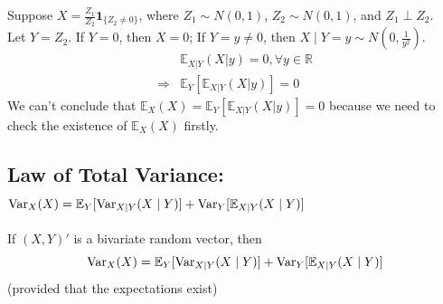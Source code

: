 \documentclass[11pt]{elegantbook}
\begin{document}
\begin{example}
    Suppose $X=\frac{Z_1}{Z_2} \mathbf{1}_{\{Z_2\neq 0\}}$, where $Z_1\sim N(0,1)$, $Z_2\sim N(0,1)$, and $Z_1\perp Z_2$.\\
    Let $Y=Z_2$. If $Y=0$, then $X=0$; If $Y=y\neq 0$, then $X\mid Y=y\sim N(0,\frac{1}{y^2})$.
    \begin{equation}
        \begin{aligned}
            &\mathbb{E}_{X|Y}(X|y)=0,\forall y\in \mathbb{R}\\
            \Rightarrow &\mathbb{E}_Y[\mathbb{E}_{X|Y}(X|y)]=0
        \end{aligned}
        \nonumber
    \end{equation}
    We can't conclude that $\mathbb{E}_X(X)=\mathbb{E}_Y[\mathbb{E}_{X|Y}(X|y)]=0$ because we need to check the existence of $\mathbb{E}_X(X)$ firstly.
\end{example}

\subsection{Law of Total Variance: $\textnormal{Var}_X(X)=\mathbb{E}_Y[\textnormal{Var}_{X|Y}(X\mid Y)]+\textnormal{Var}_Y[\mathbb{E}_{X|Y}(X\mid Y)]$}
\begin{theorem}
    If $(X,Y)'$ is a bivariate random vector, then $$\textnormal{Var}_X(X)=\mathbb{E}_Y[\textnormal{Var}_{X|Y}(X\mid Y)]+\textnormal{Var}_Y[\mathbb{E}_{X|Y}(X\mid Y)]$$
    (provided that the expectations exist)
\end{theorem}
\end{document}
